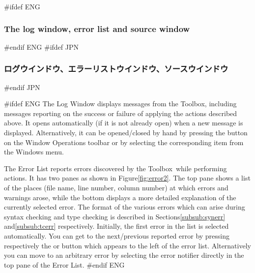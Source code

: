 \documentclass[\pformat,12pt]{article}
\newcommand{\Toolbox}{Toolbox}
\newcommand{\Toolbox}{Toolbox}
\newcommand{\guicmd}[1]{{\sf #1}}
\newcommand{\guicmd}[1]{{\gt #1}}
\begin{document}
#ifdef ENG
\subsubsection{The log window, error list and source window}
#endif ENG
#ifdef JPN
\subsubsection{ログウインドウ、エラーリストウインドウ、ソースウインドウ}
#endif JPN

#ifdef ENG
The \guicmd{Log Window} displays messages from the \Toolbox, including
messages reporting on the success or failure of applying the actions
described above. It opens automatically (if it is not already open)
when a new message is displayed. Alternatively, it can be
opened/closed by hand by pressing the 
button on the \guicmd{Window Operations} toolbar or by
selecting the corresponding item from the \guicmd{Windows} menu.


The \guicmd{Error List} reports errors discovered by the \Toolbox\
while performing actions. It has two panes as shown in
Figure\ref{fig:error2}. The top pane shows a list of the places (file
name, line number, column number) at which errors and warnings arose,
while the bottom displays a more detailed explanation of the currently
selected error. The format of the various errors which can arise
  during syntax checking and type checking is described in
  Sections\ref{subsub:synerr} and\ref{subsub:tcerr} respectively.  
Initially, the first error in the list is selected
automatically. You can get to the next/previous reported error by
pressing respectively the {\fbox{\tt >}} or \fbox{{\tt <}} button
which appears to the left of the error list. Alternatively you can
move to an arbitrary error by selecting the error notifier directly in
the top pane of the \guicmd{Error List}.
#endif ENG
\end{document}
